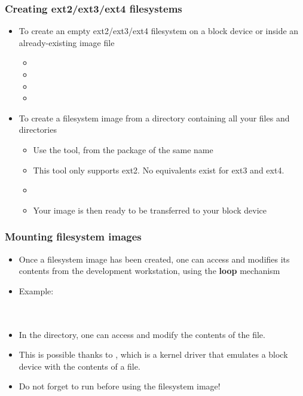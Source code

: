 \begin{frame}
  \frametitle{Creating ext2/ext3/ext4 filesystems}
  \begin{itemize}
  \item To create an empty ext2/ext3/ext4 filesystem on a block device or
    inside an already-existing image file
    \begin{itemize}
    \item {}
    \item {}
    \item {}
    \item {}
    \end{itemize}
  \item To create a filesystem image from a directory containing all
    your files and directories
    \begin{itemize}
    \item Use the  tool, from the package of the same name
    \item This tool only supports ext2. No equivalents exist for ext3
          and ext4.
    \item {}
    \item Your image is then ready to be transferred to your block
      device
    \end{itemize}
  \end{itemize}
\end{frame}

\begin{frame}
  \frametitle{Mounting filesystem images}
  \begin{itemize}
  \item Once a filesystem image has been created, one can access and
    modifies its contents from the development workstation, using the
    {\bf loop} mechanism
  \item Example:\\
    \\
    \\
  \item In the  directory, one can access and modify
    the contents of the  file.
  \item This is possible thanks to , which is a kernel
    driver that emulates a block device with the contents of a file.
  \item Do not forget to run  before using the filesystem
    image!
  \end{itemize}
\end{frame}

